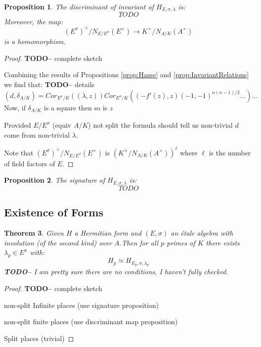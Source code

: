 \documentclass{article}
\theoremstyle{plain}
\newtheorem{theorem}{Theorem}[section]
\newtheorem{proposition}[theorem]{Proposition}
\theoremstyle{definition}
\newcommand{\TODO}[1]{\textbf{TODO-#1}}
\begin{document}
\begin{proposition}
The discriminant of invariant of $H_{E,\sigma,\lambda}$ is:
\[ TODO \]
Moreover, the map:
\[ (E^\sigma)^\times/N_{E/E^\sigma}(E^\times) \rightarrow K^\times/N_{A/K}(A^\times) \]
is a homomorphism.
\end{proposition}
\begin{proof}
\TODO - complete sketch

Combining the results of Propositions \ref{prop:Hasse} and \ref{prop:InvariantRelations} we find that:
\TODO - details
\[ (d,\delta_{A/K}) =  Cor_{E^\sigma/K}((\lambda,z)) Cor_{E^\sigma/K}((-f'(z),z) (-1,-1)^{n(n-1)/2}...) ... \]
Now, if $\delta_{A/K}$ is a square then so is $z$

Provided $E/E^\sigma$ (equiv $A/K$) not split the formula should tell us non-trivial $d$ come from non-trivial $\lambda$.

Note that  $(E^\sigma)^\times/N_{E/E^\sigma}(E^\times)$ is $( K^\times/N_{A/K}(A^\times))^\ell$ where $\ell$ is the number of field factors of $E$.
\end{proof}

\begin{proposition}
The signature of $H_{E,\sigma,\lambda}$ is:
\[ TODO \]
\end{proposition}

\subsection{Existence of Forms}

\begin{theorem}
Given $H$ a Hermitian form and $(E,\sigma)$ an \'etale algebra with involution (of the second kind) over $A$.Then for all $p$ primes of $K$ there exists $\lambda_p \in E^\sigma$ with:
\[ H_p \simeq H_{E_p,\sigma,\lambda_p} \]
\TODO - I am pretty sure there are no conditions, I haven't fully checked.
\end{theorem}
\begin{proof}
\TODO - complete sketch

non-split Infinite places (use signature proposition)

non-split finite places (use discriminant map proposition)

Split places (trivial)
\end{proof}
\end{document}
